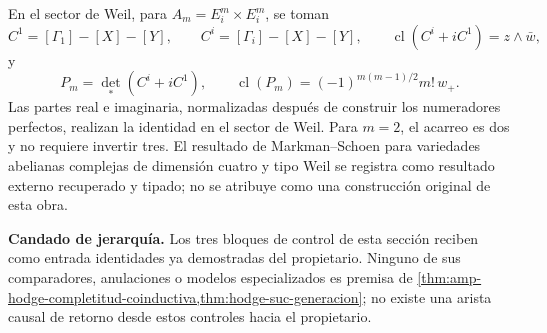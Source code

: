 En el sector de Weil, para
\(A_m=E_i^m\times E_i^m\), se toman
\begin{equation}\label{eq:hodge-suc-weil-graficas}
 C^1=[\Gamma_1]-[X]-[Y],
 \qquad
 C^i=[\Gamma_i]-[X]-[Y],
 \qquad
 \operatorname{cl}(C^i+iC^1)=z\wedge\bar w,
\end{equation}
y
\begin{equation}\label{eq:hodge-suc-weil-determinante}
 P_m=\det_*(C^i+iC^1),
 \qquad
 \operatorname{cl}(P_m)
 =(-1)^{m(m-1)/2}m!\,w_+.
\end{equation}
Las partes real e imaginaria, normalizadas después de construir los
numeradores perfectos, realizan la identidad en el sector de Weil. Para
\(m=2\), el acarreo es dos y no requiere invertir tres. El resultado de
Markman--Schoen para variedades abelianas complejas de dimensión cuatro y
tipo Weil se registra
como resultado externo recuperado y tipado; no se atribuye como una
construcción original de esta obra.

\noindent\textbf{Candado de jerarquía.}
Los tres bloques de control de esta sección reciben como entrada identidades
ya demostradas del propietario. Ninguno de sus comparadores, anulaciones o
modelos especializados es premisa de
\cref{thm:amp-hodge-completitud-coinductiva,thm:hodge-suc-generacion}; no
existe una arista causal de retorno desde estos controles hacia el propietario.
